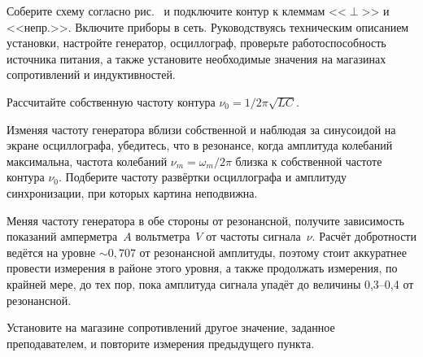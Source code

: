 \begin{lab:task}

    

	\item Соберите схему согласно рис.~
	и подключите контур к клеммам <<$\perp$>> и <<непр.>>. Включите приборы в сеть. 
    Руководствуясь техническим описанием установки, настройте генератор, 
    осциллограф, проверьте работоспособность источника питания, 
    а также установите необходимые значения на магазинах сопротивлений 
    и индуктивностей.


	\item Рассчитайте собственную частоту контура $\nu_{0} = 1/2\pi\sqrt{LC}$.

	\item Изменяя частоту генератора вблизи собственной и наблюдая за синусоидой 
    на экране осциллографа, убедитесь, что в резонансе, когда амплитуда колебаний 
    максимальна, частота колебаний $\nu_m=\omega_m/2\pi$ близка к собственной 
    частоте контура $\nu_0$. 
    Подберите частоту развёртки осциллографа и амплитуду синхронизации, 
    при которых картина неподвижна.

	\item Меняя частоту генератора в обе стороны от резонансной, получите 
    зависимость показаний амперметра~$A$ вольтметра~$V$ от частоты сигнала~$\nu$. 
    Расчёт добротности ведётся на уровне $\sim 0,707$ от резонансной амплитуды, 
    поэтому стоит аккуратнее провести измерения в районе этого уровня, 
    а также продолжать измерения, по крайней мере, до тех пор, пока амплитуда 
    сигнала упадёт до величины 0,3--0,4 от резонансной.

	\item Установите на магазине сопротивлений другое значение, заданное
преподавателем, и повторите измерения предыдущего пункта. 


\end{lab:task}
